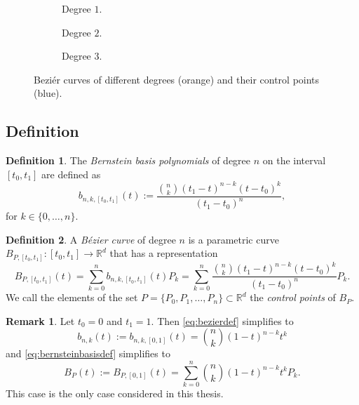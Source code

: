 \documentclass[a4paper, 11pt]{report}
\theoremstyle{definition}
\newtheorem{definition}{Definition}[section]
\newtheorem*{remark}{Remark}
\renewcommand{\emph}[1]{\textit{#1}}
\begin{document}
	\begin{figure}[H]
		\centering
		\begin{subfigure}{0.25\textwidth}
			
			\caption{Degree $1$.}
		\end{subfigure}
		\begin{subfigure}{0.25\textwidth}
			
			\caption{Degree $2$.}
		\end{subfigure}
		\begin{subfigure}{0.25\textwidth}
			
			\caption{Degree $3$.}
		\end{subfigure}
		\caption{Beziér curves of different degrees (orange) and their control points (blue).}
	\end{figure}

\subsection{Definition}
	\begin{definition}
		The \emph{Bernstein basis polynomials} of degree $n$ on the interval $[t_0,t_1]$ are defined as
		\begin{equation}\label{eq:bernsteinbasisdef}
			b_{n,k,[t_0, t_1]}(t) := \frac{\binom{n}{k} (t_1-t)^{n-k}(t-t_0)^k}{(t_1-t_0)^n},
		\end{equation}
		for $k \in \{0,\dots, n\}$.
	\end{definition}

	\begin{definition}
		A \emph{Bézier curve} of degree $n$ is a parametric curve $B_{P,[t_0, t_1]}: [t_0, t_1] \rightarrow \mathbb{R}^d$ that has a representation
		\begin{equation}\label{eq:bezierdef}
			B_{P, [t_0, t_1]}(t) = \sum_{k=0}^n b_{n,k,[t_0, t_1]}(t) P_k = \sum_{k=0}^n \frac{\binom{n}{k} (t_1-t)^{n-k}(t-t_0)^k}{(t_1-t_0)^n} P_k.
		\end{equation}
		We call the elements of the set $P = \{P_0, P_1, \dots, P_n\} \subset \mathbb{R}^d$ the \emph{control points} of $B_P$.
	\end{definition}

	\begin{remark}
		Let $t_0 = 0$ and $t_1 = 1$. Then \ref{eq:bezierdef} simplifies to
		\begin{equation}
			b_{n,k}(t) := b_{n,k,[0,1]}(t) = \binom{n}{k} (1-t)^{n-k}t^k
		\end{equation}
		and \ref{eq:bernsteinbasisdef} simplifies to
		\begin{equation}\label{eq:bezierdefshort}
			B_P(t) := B_{P,[0,1]}(t)= \sum_{k=0}^n \binom{n}{k} (1-t)^{n-k}t^k P_k.
		\end{equation}
		This case is the only case considered in this thesis.
	\end{remark}
\end{document}
